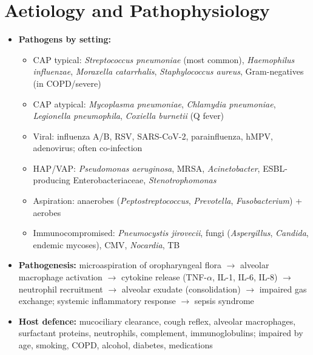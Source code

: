 \section*{Aetiology and Pathophysiology}
\begin{itemize}
    \item \textbf{Pathogens by setting:}
    \begin{itemize}
        \item CAP typical: \textit{Streptococcus pneumoniae} (most common), \textit{Haemophilus influenzae}, \textit{Moraxella catarrhalis}, \textit{Staphylococcus aureus}, Gram-negatives (in COPD/severe)
        \item CAP atypical: \textit{Mycoplasma pneumoniae}, \textit{Chlamydia pneumoniae}, \textit{Legionella pneumophila}, \textit{Coxiella burnetii} (Q fever)
        \item Viral: influenza A/B, RSV, SARS-CoV-2, parainfluenza, hMPV, adenovirus; often co-infection
        \item HAP/VAP: \textit{Pseudomonas aeruginosa}, MRSA, \textit{Acinetobacter}, ESBL-producing Enterobacteriaceae, \textit{Stenotrophomonas}
        \item Aspiration: anaerobes (\textit{Peptostreptococcus}, \textit{Prevotella}, \textit{Fusobacterium}) + aerobes
        \item Immunocompromised: \textit{Pneumocystis jirovecii}, fungi (\textit{Aspergillus}, \textit{Candida}, endemic mycoses), CMV, \textit{Nocardia}, TB
    \end{itemize}
    \item \textbf{Pathogenesis:} microaspiration of oropharyngeal flora $\to$ alveolar macrophage activation $\to$ cytokine release (TNF-$\alpha$, IL-1, IL-6, IL-8) $\to$ neutrophil recruitment $\to$ alveolar exudate (consolidation) $\to$ impaired gas exchange; systemic inflammatory response $\to$ sepsis syndrome
    \item \textbf{Host defence:} mucociliary clearance, cough reflex, alveolar macrophages, surfactant proteins, neutrophils, complement, immunoglobulins; impaired by age, smoking, COPD, alcohol, diabetes, medications
\end{itemize}


